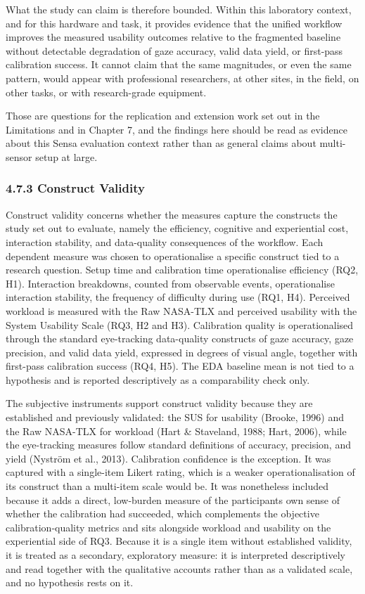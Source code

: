 \documentclass[
]{article}
\begin{document}
What the study can claim is therefore bounded. Within this laboratory context, and for this hardware and task, it provides evidence that the unified workflow improves the measured usability outcomes relative to the fragmented baseline without detectable degradation of gaze accuracy, valid data yield, or first-pass calibration success. It cannot claim that the same magnitudes, or even the same pattern, would appear with professional researchers, at other sites, in the field, on other tasks, or with research-grade equipment.

Those are questions for the replication and extension work set out in the Limitations and in Chapter 7, and the findings here should be read as evidence about this Sensa evaluation context rather than as general claims about multi-sensor setup at large.

\hypertarget{construct-validity}{%
\subsubsection{4.7.3 Construct Validity}\label{construct-validity}}

Construct validity concerns whether the measures capture the constructs the study set out to evaluate, namely the efficiency, cognitive and experiential cost, interaction stability, and data-quality consequences of the workflow. Each dependent measure was chosen to operationalise a specific construct tied to a research question. Setup time and calibration time operationalise efficiency (RQ2, H1). Interaction breakdowns, counted from observable events, operationalise interaction stability, the frequency of difficulty during use (RQ1, H4). Perceived workload is measured with the Raw NASA-TLX and perceived usability with the System Usability Scale (RQ3, H2 and H3). Calibration quality is operationalised through the standard eye-tracking data-quality constructs of gaze accuracy, gaze precision, and valid data yield, expressed in degrees of visual angle, together with first-pass calibration success (RQ4, H5). The EDA baseline mean is not tied to a hypothesis and is reported descriptively as a comparability check only.

The subjective instruments support construct validity because they are established and previously validated: the SUS for usability (Brooke, 1996) and the Raw NASA-TLX for workload (Hart \& Staveland, 1988; Hart, 2006), while the eye-tracking measures follow standard definitions of accuracy, precision, and yield (Nyström et al., 2013). Calibration confidence is the exception. It was captured with a single-item Likert rating, which is a weaker operationalisation of its construct than a multi-item scale would be. It was nonetheless included because it adds a direct, low-burden measure of the participant\textquotesingle s own sense of whether the calibration had succeeded, which complements the objective calibration-quality metrics and sits alongside workload and usability on the experiential side of RQ3. Because it is a single item without established validity, it is treated as a secondary, exploratory measure: it is interpreted descriptively and read together with the qualitative accounts rather than as a validated scale, and no hypothesis rests on it.
\end{document}
